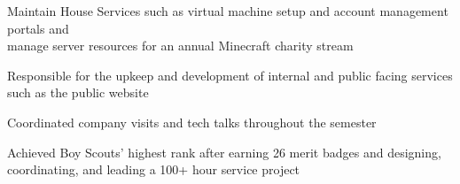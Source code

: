

\smallskip
\smallskip


\medskip
{}

Maintain House Services such as virtual machine setup and account management portals and \\ manage server resources for an annual Minecraft charity stream

\divider

Responsible for the upkeep and development of internal and public facing services such as the public website

\divider

Coordinated company visits and tech talks throughout the semester

\divider

Achieved Boy Scouts' highest rank after earning 26 merit badges and designing, coordinating, and leading a 100+ hour service project

